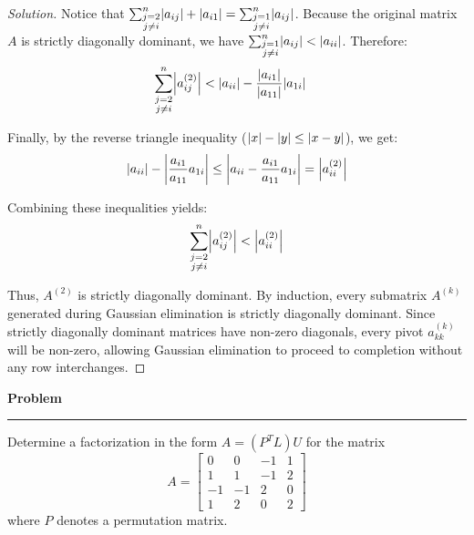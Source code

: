 \documentclass[11pt, a4paper]{article}
\DeclarePairedDelimiter\abs{\lvert}{\rvert}
\newenvironment{problem}{%
  \begin{tcolorbox}[
    colback=blue!4!white,
    colframe=blue!38!black,
    boxrule=0.95pt,
    arc=3pt,
    left=11pt,
    right=11pt,
    top=10pt,
    bottom=11pt,
    before skip=12pt,
    after skip=14pt,
  ]
  \noindent\textbf{\textcolor{blue!35!black}{Problem}}\par\nointerlineskip
  {\color{blue!42!black}\rule{\linewidth}{0.55pt}}\par\vspace{0.55em}%
}{%
  \end{tcolorbox}%
}
\newif\ifsolutionnewpage
\newenvironment{solution}
  {\begin{proof}[Solution]}
  {\end{proof}\ifsolutionnewpage\newpage\fi}
\begin{document}
\begin{solution}
    Notice that $\sum_{\substack{j=2 \\ j \neq i}}^n \abs{a_{ij}} + \abs{a_{i1}} = \sum_{\substack{j=1 \\ j \neq i}}^n \abs{a_{ij}}$. Because the original matrix $A$ is strictly diagonally dominant, we have $\sum_{\substack{j=1 \\ j \neq i}}^n \abs{a_{ij}} < \abs{a_{ii}}$. Therefore:
    \begin{align*}
        \sum_{\substack{j=2 \\ j \neq i}}^n \abs*{a_{ij}^{(2)}} &< \abs{a_{ii}} - \frac{\abs{a_{i1}}}{\abs{a_{11}}} \abs{a_{1i}}
    \end{align*}
    
    Finally, by the reverse triangle inequality ($\abs{x} - \abs{y} \le \abs{x - y}$), we get:
    \[
    \abs{a_{ii}} - \abs*{\frac{a_{i1}}{a_{11}} a_{1i}} \le \abs*{a_{ii} - \frac{a_{i1}}{a_{11}} a_{1i}} = \abs*{a_{ii}^{(2)}}
    \]
    
    Combining these inequalities yields:
    \[
    \sum_{\substack{j=2 \\ j \neq i}}^n \abs*{a_{ij}^{(2)}} < \abs*{a_{ii}^{(2)}}
    \]
    
    Thus, $A^{(2)}$ is strictly diagonally dominant. By induction, every submatrix $A^{(k)}$ generated during Gaussian elimination is strictly diagonally dominant. Since strictly diagonally dominant matrices have non-zero diagonals, every pivot $a_{kk}^{(k)}$ will be non-zero, allowing Gaussian elimination to proceed to completion without any row interchanges.
\end{solution}

\begin{problem}
    Determine a factorization in the form $A=(P^{T}L)U$ for the matrix
    \[
    A=\begin{bmatrix}0&0&-1&1\\ 1&1&-1&2\\ -1&-1&2&0\\ 1&2&0&2\end{bmatrix}
    \]
    where $P$ denotes a permutation matrix.
\end{problem}
\end{document}
